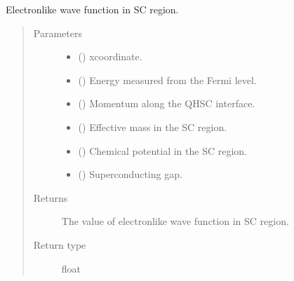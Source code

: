 \documentclass[letterpaper,10pt,english]{sphinxmanual}
\begin{document}

\begin{fulllineitems}
\label{\detokenize{modules:modules.functions.phi_p}}
\pysigstartsignatures
{}
\pysigstopsignatures
\sphinxAtStartPar
Electron\sphinxhyphen{}like wave function in SC region.
\begin{quote}\begin{description}
\item[{Parameters}] \leavevmode\begin{itemize}
\item {} 
\sphinxAtStartPar
{} () \textendash{} x\sphinxhyphen{}coordinate.

\item {} 
\sphinxAtStartPar
{} () \textendash{} Energy measured from the Fermi level.

\item {} 
\sphinxAtStartPar
{} () \textendash{} Momentum along the QH\sphinxhyphen{}SC interface.

\item {} 
\sphinxAtStartPar
{} () \textendash{} Effective mass in the SC region.

\item {} 
\sphinxAtStartPar
{} () \textendash{} Chemical potential in the SC region.

\item {} 
\sphinxAtStartPar
{} () \textendash{} Superconducting gap.

\end{itemize}

\item[{Returns}] \leavevmode
\sphinxAtStartPar
The value of electron\sphinxhyphen{}like wave function in SC region.

\item[{Return type}] \leavevmode
\sphinxAtStartPar
float

\end{description}\end{quote}

\end{fulllineitems}
\end{document}
